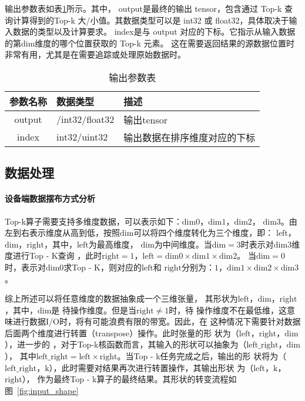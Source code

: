     输出参数表如表\ref{tab:output_tab}所示。其中，
    output是最终的输出 tensor，包含通过 Top-k 查询计算得到的Top-k 大/小值。其数据类型可以是 int32 或 float32，具体取决于输入数据的类型以及计算要求。
    index是与 output 对应的下标。它指示从输入数据的第dim维度的哪个位置获取的 Top-k 元素。
    这在需要返回结果的源数据位置时非常有用，尤其是在需要追踪或处理原始数据时。
    \begin{table}
        \centering
        \caption{输出参数表}
        \label{tab:output_tab}
        \begin{tabular}{cll} %
          \toprule
          参数名称   & 数据类型                                       & 描述                          \\
          \midrule
          output & /int32/float32 & 输出tensor                 \\
          index   & int32/uint32   & 输出数据在排序维度对应的下标              \\
          \bottomrule
        \end{tabular}
    \end{table}

    \subsection{数据处理}
    \paragraph{设备端数据摆布方式分析}
    

    Top-k算子需要支持多维度数据，可以表示如下：\(\text{dim0}\)，\(\text{dim1}\)，\(\text{dim2}\)，
    \(\text{dim3}\)。由左到右表示维度从高到低，按照\(\text{dim}\)可以将四个维度转化为三个维度，即：
    \(\text{left}\)，\(\text{dim}\)，\(\text{right}\)，其中，\(\text{left}\)为最高维度，
    \(\text{dim}\)为中间维度。当\(\text{dim} = 3\)时表示对\(\text{dim3}\)维度进行Top - K查询
    ，此时\(\text{right} = 1\)，\(\text{left} = \text{dim0}×\text{dim1}×\text{dim2}\)。
    当\(\text{dim} = 0\)时，表示对\(\text{dim0}\)求Top - K，则对应的\(\text{left}\)和
    \(\text{right}\)分别为：\(1\)，\(\text{dim1}×\text{dim2}×\text{dim3}\)。
    
    综上所述可以将任意维度的数据抽象成一个三维张量，
    其形状为\(\text{left}\)，\(\text{dim}\)，\(\text{right}\)，其中，\(\text{dim}\)是
    待操作维度。但是当\(\text{right}≠1\)时，待
    操作维度不在最低维，这意味进行数据I/O时，将有可能浪费有限的带宽。因此，在
    这种情况下需要针对数据后面两个维度进行转置（transpose）操作。此时张量的形
    状为（\(\text{left}\)，\(\text{right}\)，\(\text{dim}\)），进一步的
    ，对于Top-k核函数而言，其输入的形状可以抽象为（\(\text{left\_right}\)，\(\text{dim}\)），
    其中\(\text{left\_right}=\text{left}×\text{right}\)。当Top - k任务完成之后，输出的形
    状将为（\(\text{left\_right}\)，\(\text{k}\)），此时需要对结果再次进行转置操作，其输出形状
    为（\(\text{left}\)，\(\text{k}\)，\(\text{right}\)），
    作为最终Top - k算子的最终结果。其形状的转变流程如图~\ref{fig:input_shape}
    
